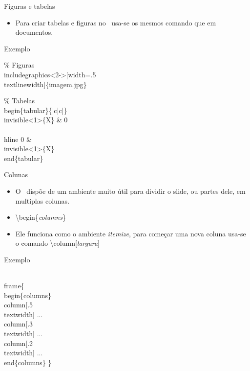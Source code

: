 \begin{frame}[fragile]{Figuras e tabelas}
    \begin{itemize}
    \item Para criar tabelas e figuras no \beamer\ usa-se os mesmos comando que em documentos.
    \end{itemize}

    \begin{exampleblock}{Exemplo}
\begin{semiverbatim}
\small \% Figuras
\\includegraphics<2->[width=.5\\textlinewidth]\{imagem.jpg\}

\% Tabelas
\\begin\{tabular\}\{|c|c|\}
    \\invisible<1>\{X\} \& 0 \\
    \\hline
    0 \& \\invisible<1>\{X\}
\\end\{tabular\}
\end{semiverbatim}
    \end{exampleblock}

\end{frame}

\begin{frame}[fragile]{Colunas}
    \begin{itemize}
    \item O \beamer\ dispõe de um ambiente muito útil para dividir o slide, ou partes dele, em multiplas colunas.
    \item[] \alert{\textbackslash begin\{\textit{columns}\}}
    \item Ele funciona como o ambiente \textit{itemize}, para começar uma nova coluna usa-se o comando \alert{\textbackslash column[\textit{largura}]}
    \end{itemize}

    \begin{exampleblock}{Exemplo}
    \begin{semiverbatim}
    \footnotesize\\frame\{
        \\begin\{columns\}
        \\column[.5\\textwidth]
        ...
        \\column[.3\\textwidth]
        ...
        \\column[.2\\textwidth]
        ...
        \\end\{columns\}
    \}
\end{semiverbatim}
    \end{exampleblock}
\end{frame}

